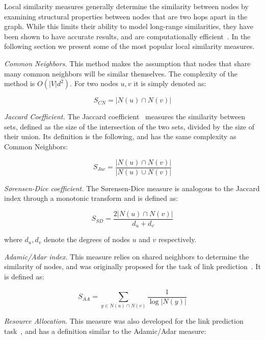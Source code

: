 Local similarity measures generally determine the similarity between
nodes by examining structural properties between nodes that
are two hops apart in the graph. While this limits their ability to model long-range
similarities, they have been shown to have accurate results, and are computationally
efficient~\cite{link-prediction-survey}. In the following section we present some of the most popular local similarity measures.


\emph{Common Neighbors.} This method makes the assumption that nodes that
share many common neighbors will be similar themselves. The complexity of
the method is $O(|V|d^2)$. For two nodes $u, v$
it is simply denoted as:

\begin{equation}
	S_{CN} = |N(u) \cap N(v)|
\end{equation}


\emph{Jaccard Coefficient.} The Jaccard coefficient~\cite{Jaccard1912} measures the similarity between
sets, defined as the size of the intersection of the two sets, divided by the size of their
union. Its definition is the following, and has the same complexity as Common Neighbors:

\begin{equation}
	S_{Jac} = \frac{|N(u) \cap N(v)|}{|N(u) \cup N(v)|}
\end{equation}

\emph{S{\o}rensen-Dice coefficient.} The S{\o}rensen-Dice measure \cite{Dice45,Sorensen48} is
analogous to the Jaccard index through a monotonic transform and is defined as:

\begin{equation}
	S_{SD} = \frac{2|N(u) \cap N(v)|}{d_u + d_v}
\end{equation}

\noindent
where $d_u, d_v$ denote the degrees of nodes $u$ and $v$ respectively.

\emph{Adamic/Adar index}. This measure relies on shared neighbors to determine
the similarity of nodes, and was originally proposed for the task of link
prediction~\cite{adamic-adar}. It is defined as:

\begin{equation}
	S_{AA} = \sum_{y \in N(u) \cap N(v)}{\frac{1}{\log{|N(y)|}}}
\end{equation}

\emph{Resource Allocation}. This measure was also developed for the
link prediction task~\cite{resource-allocation-sim}, and has a definition
similar to the Adamic/Adar measure:

